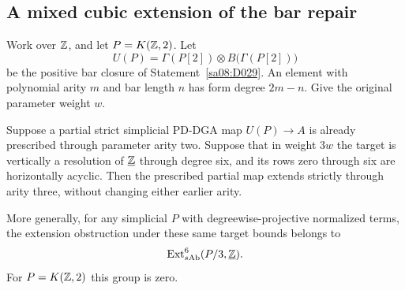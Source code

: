 \subsection{A mixed cubic extension of the bar repair}

\begin{proposition}
\label{sa08:C25}
Work over $\mathbb Z$, and let $P=K(\mathbb Z,2)$.
Let
\[
 U(P)=\Gamma(P[2])\otimes B\bigl(\Gamma(P[2])\bigr)
\]
be the positive bar closure of Statement~\ref{sa08:D029}.
An element with polynomial arity $m$ and bar length
$n$ has form degree $2m-n$. Give the original
parameter weight $w$.

Suppose a partial strict simplicial PD-DGA map
$U(P)\to A$ is already prescribed through
parameter arity two. Suppose that in weight $3w$
the target is vertically a resolution of
$\underline{\mathbb Z}$ through degree six, and its
rows zero through six are horizontally acyclic.
Then the prescribed partial map extends strictly
through arity three, without changing either
earlier arity.

More generally, for any simplicial $P$ with
degreewise-projective normalized terms, the
extension obstruction under these same target
bounds belongs to
\[
 \operatorname{Ext}^6_{s\mathrm{Ab}}
          (P/3,\underline{\mathbb Z}).
\]
For $P=K(\mathbb Z,2)$ this group is zero.
\end{proposition}
